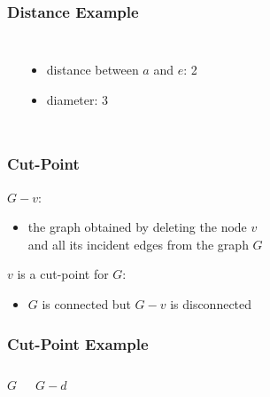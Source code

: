 \documentclass[dvipsnames]{beamer}
\begin{document}
\begin{frame}
  \frametitle{Distance Example}

  \begin{example}
    \begin{columns}
      \begin{center}
      \end{center}

      \pause
      \begin{itemize}
        \item distance between $a$ and $e$: 2\\
        \item diameter: 3
      \end{itemize}
    \end{columns}
  \end{example}
\end{frame}

\begin{frame}
  \frametitle{Cut-Point}

  \begin{definition}
    \alert{$G - v$}:
    \begin{itemize}
      \item the graph obtained by deleting the node $v$\\
        and all its incident edges from the graph $G$
    \end{itemize}
  \end{definition}

  \pause
  \begin{definition}
    $v$ is a \alert{cut-point} for $G$:
    \begin{itemize}
      \item $G$ is connected but $G - v$ is disconnected
    \end{itemize}
  \end{definition}
\end{frame}

\begin{frame}
  \frametitle{Cut-Point Example}

  \begin{columns}
    \begin{block}{$G$}
      \begin{center}
      \end{center}
    \end{block}

    \begin{block}{$G - d$}
      \begin{center}
      \end{center}
    \end{block}
  \end{columns}
\end{frame}
\end{document}
